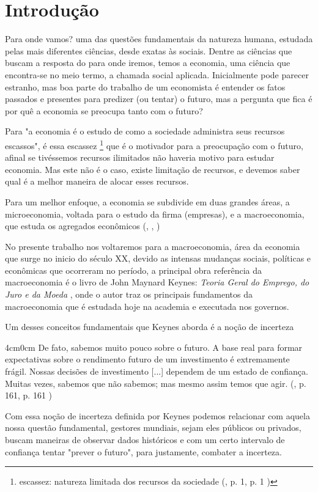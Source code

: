 \documentclass[12pt]{article}%
\newcommand{\citem}[2][]{%
	(\citeauthoronline{#2}, \citeyear{#2}%
	\ifx#1\empty\else, #1\fi%
	)%
}
\newenvironment{ABNTQuote}
{\begin{adjustwidth}{4cm}{0cm}\fontsize{10pt}{12pt}\selectfont\justifying\singlespacing}
	{\end{adjustwidth}\par\normalfont\normalsize\justifying}
\begin{document}
	\printacronyms
	\newpage
	
	\tableofcontents
	
	\newpage
	\section{Introdução}
	Para onde vamos? uma das questões fundamentais da natureza humana, estudada pelas mais diferentes ciências, desde exatas às sociais. Dentre as ciências que buscam a resposta do para onde iremos, temos a economia, uma ciência que encontra-se no meio termo, a chamada social aplicada. Inicialmente pode parecer estranho, mas boa parte do trabalho de um economista é entender os fatos passados e presentes para predizer (ou tentar) o  futuro, mas a pergunta que fica é por quê a economia se preocupa tanto com o futuro?
	
	Para  "a economia é o estudo de como a sociedade administra seus recursos escassos", é essa escassez \footnote{escassez:  natureza limitada dos recursos da sociedade \citem[p. 1]{mankiw2025introduccao}} que é o motivador para a preocupação com o futuro, afinal se tivéssemos recursos ilimitados não haveria motivo para estudar economia. Mas este não é o caso, existe limitação de recursos, e devemos saber qual é a melhor maneira de alocar esses recursos.
	
	Para um melhor enfoque, a economia se subdivide em duas grandes áreas, a microeconomia, voltada para o estudo da firma (empresas), e a macroeconomia, que estuda os agregados econômicos \citem{Vasconcelos}
	
	No presente trabalho nos voltaremos para a macroeconomia, área da economia que surge no inicio do século XX, devido as intensas mudanças sociais, políticas e econômicas que ocorreram no período, a principal obra referência da macroeconomia é o livro de John Maynard Keynes: \textit{Teoria Geral do Emprego, do Juro e da Moeda} \citeyear{KEYNES1936}, onde o autor traz os principais fundamentos da macroeconomia que é estudada hoje na academia e executada nos governos.
	
	
	Um desses conceitos fundamentais que Keynes aborda é a noção de incerteza
	\begin{ABNTQuote}
	De fato, sabemos muito pouco sobre o futuro. A base real para formar expectativas sobre o rendimento futuro de um investimento é extremamente frágil. Nossas decisões de investimento [...] dependem de um estado de confiança. Muitas vezes, sabemos que não sabemos; mas mesmo assim temos que agir. \citem[p. 161]{KEYNES1936}
	\end{ABNTQuote}
	Com essa noção de incerteza definida por Keynes podemos relacionar com aquela nossa questão fundamental, gestores mundiais, sejam eles públicos ou privados, buscam maneiras de observar dados históricos e com um certo intervalo de confiança tentar "prever o futuro", para justamente, combater a incerteza.
	
\end{document}
